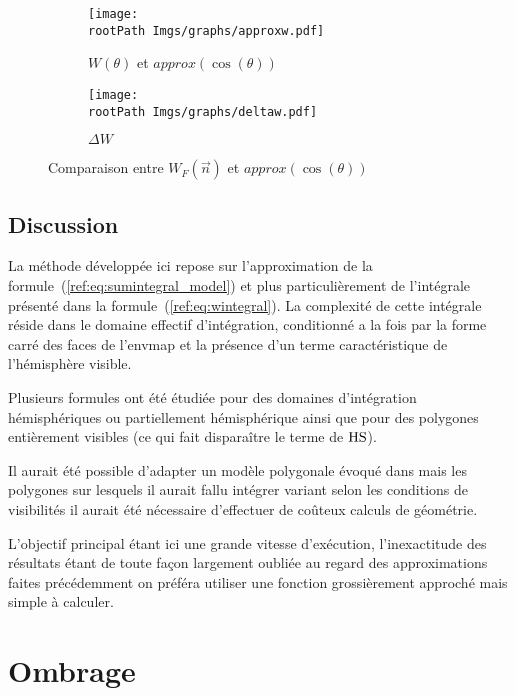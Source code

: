 \documentclass[10pt,a4paper,twoside, twocolumn]{report}
\newcommand*{\rootPath}{../}
\begin{document}
\begin{figure}[!ht]\centering
	\begin{subfigure}[b]{0.4\textwidth}\centering
		\texttt{[image: \\rootPath Imgs/graphs/approxw.pdf]}
		\caption{$W(\theta)$ et $approx(\cos(\theta))$}
	\end{subfigure}
	\begin{subfigure}[b]{0.4\textwidth}\centering
		\texttt{[image: \\rootPath Imgs/graphs/deltaw.pdf]}
		\caption{$\Delta W$}
	\end{subfigure}
	\caption{Comparaison entre $W_F(\vec n)$ et $approx(\cos(\theta))$ }
	\label{fig:curve:w_approx}
\end{figure}


\subsection{Discussion}

La méthode développée ici repose sur l'approximation de la formule~(\ref{ref:eq:sumintegral_model}) et plus particulièrement de l'intégrale présenté dans la formule~(\ref{ref:eq:wintegral}). La complexité de cette intégrale réside dans le domaine effectif d'intégration, conditionné a la fois par la forme carré des faces de l'envmap et la présence d'un terme caractéristique de l'hémisphère visible.

Plusieurs formules ont été étudiée pour des domaines d'intégration hémisphériques ou partiellement hémisphérique ainsi que pour des polygones entièrement visibles \cite{Snyder1996} (ce qui fait disparaître le terme de $\operatorname{HS}$).

Il aurait été possible d'adapter un modèle polygonale évoqué dans \cite{Snyder1996} mais les polygones sur lesquels il aurait fallu intégrer variant selon les conditions de visibilités il aurait été nécessaire d'effectuer de coûteux calculs de géométrie.

L'objectif principal étant ici une grande vitesse d'exécution, l'inexactitude des résultats étant de toute façon largement oubliée au regard des approximations faites précédemment on préféra utiliser une fonction grossièrement approché mais simple à calculer.




\section{Ombrage}\label{section:ombres}
\end{document}
